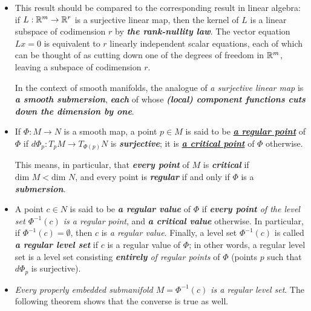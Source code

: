 \documentclass[11pt]{article}
\begin{document}
\begin{itemize}
\item \begin{remark}
This result should be compared to the corresponding result in linear algebra: if $L: {\mathbb R}^m \rightarrow {\mathbb R}^r$ is a surjective linear map, then the kernel of $L$ is a linear subspace of codimension $r$ by \emph{\textbf{the rank-nullity law}}.  The vector equation $Lx = 0$ is equivalent to $r$ linearly independent scalar equations, each of which can be thought of as cutting down one of the degrees of freedom in ${\mathbb R}^m$, leaving a subspace of codimension $r$. 

In the context of smooth manifolds, the analogue of \emph{a surjective linear map} is \emph{\textbf{a smooth submersion}}, \emph{\textbf{each}} of whose \emph{\textbf{(local) component functions cuts down the dimension by one}}.
\end{remark}

\item \begin{definition}
If $\Phi: M \rightarrow N$ is a smooth map, a point $p \in M$ is said to be \underline{\emph{\textbf{a regular point}}} of $\Phi$ if $d\Phi_{p}: T_{p}M \rightarrow
T_{\Phi(p)}N$ is \emph{\textbf{surjective}}; it is \underline{\emph{\textbf{a critical point}}} of $\Phi$ otherwise. 

This means, in particular, that \emph{\textbf{every point}} of $M$ is \emph{\textbf{critical}} if \underline{$\text{dim }M < \text{dim }N$}, and every point is \emph{\textbf{regular}} if and only if $\Phi$ is a \emph{\textbf{submersion}}. 
\end{definition}

\item \begin{definition}
A point $c \in N$ is said to be \emph{\textbf{a regular value}} of  $\Phi$ if \emph{\textbf{every point} of the level set $\Phi^{-1}(c)$  is a regular point}, and \emph{\textbf{a critical value}} otherwise. In particular, if $\Phi^{-1}(c) = \emptyset$, then $c$ is \emph{a regular value}. Finally, a level set $\Phi^{-1}(c)$  is called \emph{\textbf{a regular level set}} if $c$ is a regular value of $\Phi$; in other words, a regular level set is a level set consisting \emph{\textbf{entirely} of regular points} of $\Phi$ (points $p$ such that $d\Phi_{p}$ is surjective).
\end{definition}

\item \begin{remark}
\emph{Every properly embedded submanifold $M = \Phi^{-1}(c)$ is a regular level set}. The following theorem shows that the converse is true as well. 
\end{remark}


\end{itemize}
\end{document}
